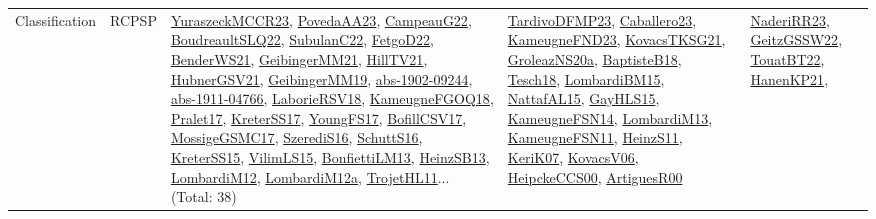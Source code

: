 {\begin{longtable}{lp{3cm}>{\raggedright}p{6cm}>{\raggedright}p{6cm}p{8cm}}
Classification & RCPSP & \href{articles/YuraszeckMCCR23.pdf}{YuraszeckMCCR23}\cite{YuraszeckMCCR23}, \href{papers/PovedaAA23.pdf}{PovedaAA23}\cite{PovedaAA23}, \href{articles/CampeauG22.pdf}{CampeauG22}\cite{CampeauG22}, \href{papers/BoudreaultSLQ22.pdf}{BoudreaultSLQ22}\cite{BoudreaultSLQ22}, \href{articles/SubulanC22.pdf}{SubulanC22}\cite{SubulanC22}, \href{articles/FetgoD22.pdf}{FetgoD22}\cite{FetgoD22}, \href{papers/BenderWS21.pdf}{BenderWS21}\cite{BenderWS21}, \href{papers/GeibingerMM21.pdf}{GeibingerMM21}\cite{GeibingerMM21}, \href{papers/HillTV21.pdf}{HillTV21}\cite{HillTV21}, \href{articles/HubnerGSV21.pdf}{HubnerGSV21}\cite{HubnerGSV21}, \href{papers/GeibingerMM19.pdf}{GeibingerMM19}\cite{GeibingerMM19}, \href{articles/abs-1902-09244.pdf}{abs-1902-09244}\cite{abs-1902-09244}, \href{articles/abs-1911-04766.pdf}{abs-1911-04766}\cite{abs-1911-04766}, \href{articles/LaborieRSV18.pdf}{LaborieRSV18}\cite{LaborieRSV18}, \href{papers/KameugneFGOQ18.pdf}{KameugneFGOQ18}\cite{KameugneFGOQ18}, \href{papers/Pralet17.pdf}{Pralet17}\cite{Pralet17}, \href{articles/KreterSS17.pdf}{KreterSS17}\cite{KreterSS17}, \href{papers/YoungFS17.pdf}{YoungFS17}\cite{YoungFS17}, \href{papers/BofillCSV17.pdf}{BofillCSV17}\cite{BofillCSV17}, \href{papers/MossigeGSMC17.pdf}{MossigeGSMC17}\cite{MossigeGSMC17}, \href{papers/SzerediS16.pdf}{SzerediS16}\cite{SzerediS16}, \href{papers/SchuttS16.pdf}{SchuttS16}\cite{SchuttS16}, \href{papers/KreterSS15.pdf}{KreterSS15}\cite{KreterSS15}, \href{papers/VilimLS15.pdf}{VilimLS15}\cite{VilimLS15}, \href{papers/BonfiettiLM13.pdf}{BonfiettiLM13}\cite{BonfiettiLM13}, \href{articles/HeinzSB13.pdf}{HeinzSB13}\cite{HeinzSB13}, \href{articles/LombardiM12.pdf}{LombardiM12}\cite{LombardiM12}, \href{articles/LombardiM12a.pdf}{LombardiM12a}\cite{LombardiM12a}, \href{articles/TrojetHL11.pdf}{TrojetHL11}\cite{TrojetHL11}... (Total: 38) & \href{papers/TardivoDFMP23.pdf}{TardivoDFMP23}\cite{TardivoDFMP23}, \href{articles/Caballero23.pdf}{Caballero23}\cite{Caballero23}, \href{papers/KameugneFND23.pdf}{KameugneFND23}\cite{KameugneFND23}, \href{papers/KovacsTKSG21.pdf}{KovacsTKSG21}\cite{KovacsTKSG21}, \href{papers/GroleazNS20a.pdf}{GroleazNS20a}\cite{GroleazNS20a}, \href{articles/BaptisteB18.pdf}{BaptisteB18}\cite{BaptisteB18}, \href{papers/Tesch18.pdf}{Tesch18}\cite{Tesch18}, \href{papers/LombardiBM15.pdf}{LombardiBM15}\cite{LombardiBM15}, \href{articles/NattafAL15.pdf}{NattafAL15}\cite{NattafAL15}, \href{papers/GayHLS15.pdf}{GayHLS15}\cite{GayHLS15}, \href{articles/KameugneFSN14.pdf}{KameugneFSN14}\cite{KameugneFSN14}, \href{papers/LombardiM13.pdf}{LombardiM13}\cite{LombardiM13}, \href{papers/KameugneFSN11.pdf}{KameugneFSN11}\cite{KameugneFSN11}, \href{papers/HeinzS11.pdf}{HeinzS11}\cite{HeinzS11}, \href{papers/KeriK07.pdf}{KeriK07}\cite{KeriK07}, \href{papers/KovacsV06.pdf}{KovacsV06}\cite{KovacsV06}, \href{articles/HeipckeCCS00.pdf}{HeipckeCCS00}\cite{HeipckeCCS00}, \href{articles/ArtiguesR00.pdf}{ArtiguesR00}\cite{ArtiguesR00} & \href{articles/NaderiRR23.pdf}{NaderiRR23}\cite{NaderiRR23}, \href{papers/GeitzGSSW22.pdf}{GeitzGSSW22}\cite{GeitzGSSW22}, \href{papers/TouatBT22.pdf}{TouatBT22}\cite{TouatBT22}, \href{papers/HanenKP21.pdf}{HanenKP21}\cite{HanenKP21}, 
\end{longtable}}
